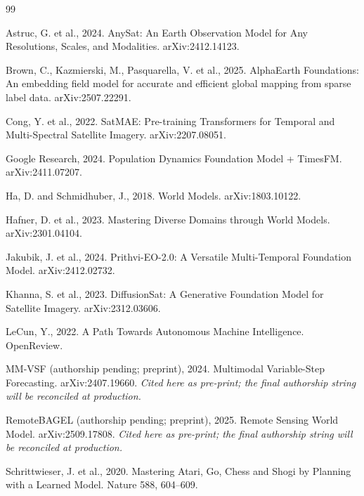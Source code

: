 \documentclass{article}
\begin{document}
\begin{thebibliography}{99}

Astruc, G. et al., 2024. AnySat: An Earth Observation Model for Any Resolutions, Scales, and Modalities. arXiv:2412.14123.

Brown, C., Kazmierski, M., Pasquarella, V. et al., 2025. AlphaEarth Foundations: An embedding field model for accurate and efficient global mapping from sparse label data. arXiv:2507.22291.

Cong, Y. et al., 2022. SatMAE: Pre-training Transformers for Temporal and Multi-Spectral Satellite Imagery. arXiv:2207.08051.

Google Research, 2024. Population Dynamics Foundation Model + TimesFM. arXiv:2411.07207.

Ha, D. and Schmidhuber, J., 2018. World Models. arXiv:1803.10122.

Hafner, D. et al., 2023. Mastering Diverse Domains through World Models. arXiv:2301.04104.

Jakubik, J. et al., 2024. Prithvi-EO-2.0: A Versatile Multi-Temporal Foundation Model. arXiv:2412.02732.

Khanna, S. et al., 2023. DiffusionSat: A Generative Foundation Model for Satellite Imagery. arXiv:2312.03606.

LeCun, Y., 2022. A Path Towards Autonomous Machine Intelligence. OpenReview.

MM-VSF (authorship pending; preprint), 2024. Multimodal Variable-Step Forecasting. arXiv:2407.19660. \emph{Cited here as pre-print; the final authorship string will be reconciled at production.}

RemoteBAGEL (authorship pending; preprint), 2025. Remote Sensing World Model. arXiv:2509.17808. \emph{Cited here as pre-print; the final authorship string will be reconciled at production.}

Schrittwieser, J. et al., 2020. Mastering Atari, Go, Chess and Shogi by Planning with a Learned Model. Nature 588, 604--609.


\end{thebibliography}
\end{document}
